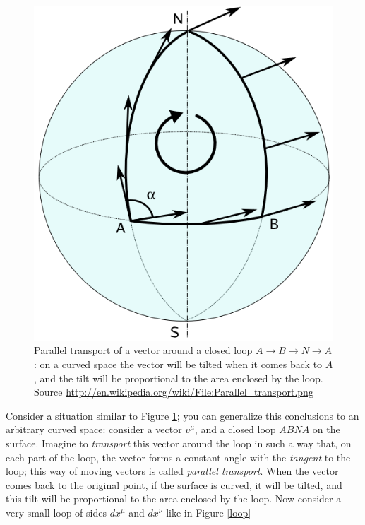 \begin{figure}
\begin{center}
\includegraphics[scale=0.5]{Draw/Parallel_transport.png}
\end{center}
\caption{Parallel transport of a vector around a closed loop $A\rightarrow B\rightarrow N \rightarrow A$: on a curved space the vector will be tilted when it comes back to $A$, and the tilt will be proportional to the area enclosed by the loop. Source \url{http://en.wikipedia.org/wiki/File:Parallel_transport.png}}
\label{transport}
\end{figure}
Consider a situation similar to Figure \ref{transport}; you can generalize this conclusions to an arbitrary curved space: consider a vector $v^\mu$, and a closed loop $ABNA$ on the surface. Imagine to \textit{transport} this vector around the loop in such a way that, on each part of the loop, the vector forms a constant angle with the \textit{tangent} to the loop; this way of moving vectors is called \textit{parallel transport}. When the vector comes back to the original point, if the surface is curved, it will be tilted, and this tilt will be proportional to the area enclosed by the loop. Now consider a very small loop of sides $dx^\mu$ and $dx^\nu$ like in Figure \ref{loop}
